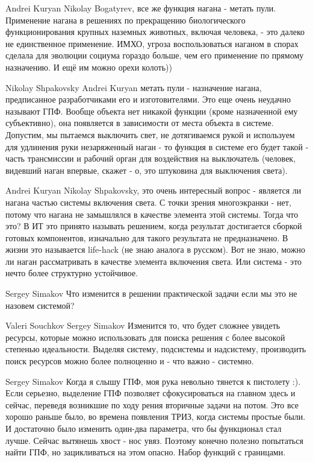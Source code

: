 \documentclass[11pt,a4paper]{article}
\begin{document}
Andrei Kuryan Nikolay Bogatyrev, все же функция нагана - метать
пули. Применение нагана в решениях по прекращению биологического
функционирования крупных наземных животных, включая человека, - это далеко не
единственное применение. ИМХО, угроза воспользоваться наганом в спорах сделала
для эволюции социума гораздо больше, чем его применение по прямому
назначению. И ещё им можно орехи колоть))

Nikolay Shpakovsky Andrei Kuryan метать пули - назначение нагана, предписанное
разработчиками его и изготовителями. Это еще очень неудачно называют ГПФ.
Вообще объекта нет никакой функции (кроме назначенной ему субъективно), она
появляется в зависимости от места объекта в системе.  Допустим, мы пытаемся
выключить свет, не дотягиваемся рукой и используем для удлинения руки
незаряженный наган - то функция в системе его будет такой - часть трансмиссии
и рабочий орган для воздействия на выключатель (человек, видевший наган
впервые, скажет - о, это штуковина для выключения света).

Andrei Kuryan Nikolay Shpakovsky, это очень интересный вопрос - является ли
нагана частью системы включения света.  С точки зрения многоэкранки - нет,
потому что нагана не замышлялся в качестве элемента этой системы.  Тогда что
это?  В ИТ это принято называть решением, когда результат достигается сборкой
готовых компонентов, изначально для такого результата не предназначено. В
жизни это называется life-hack (не знаю аналога в русском).  Вот не знаю,
можно ли наган рассматривать в качестве элемента включения света. Или система
- это нечто более структурно устойчивое.

Sergey Simakov Что изменится в решении практической задачи если мы это не
назовем системой?

Valeri Souchkov Sergey Simakov Изменится то, что будет сложнее увидеть
ресурсы, которые можно использовать для поиска решения с более высокой
степенью идеальности. Выделяя систему, подсистемы и надсистему, производить
поиск ресурсов можно более полноценно и - что важно - системно.

Sergey Simakov Когда я слышу ГПФ, моя рука невольно тянется к пистолету :).
Если серьезно, выделение ГПФ позволяет сфокусироваться на главном здесь и
сейчас, переведя возникшие по ходу рения вторичные задачи на потом. Это все
хорошо раньше было, во времена появления ТРИЗ, когда системы простые были. И
достаточно было изменить один-два параметра, что бы функционал стал лучше.
Сейчас вытянешь хвост - нос увяз. Поэтому конечно полезно попытаться найти
ГПФ, но зацикливаться на этом опасно. Набор функций с границами.
\end{document}
